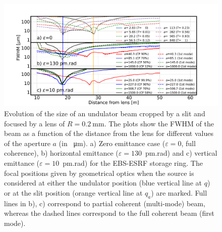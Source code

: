 \documentclass[doublecol]{epl2}
\begin{document}
\begin{figure}[t]
\hspace*{-1.5cm}
\centering
\includegraphics[width=1.15\textwidth]{evolution-eps-converted-to.pdf}
\caption{Evolution of the size of an undulator beam cropped by a slit and focused by a lens of $R=\SI{0.2}{\milli\meter}$.
The plots show the FWHM of the beam as a function of the distance from the lens for different values of the aperture $a$ (in \SI{}{\micro\meter}). 
a) Zero emittance case ($\varepsilon=0$, full coherence),
b) horizontal emittance ($\varepsilon=130$~pm.rad) and c) vertical emittance ($\varepsilon=10$~pm.rad) for the EBS-ESRF storage ring.
The focal positions given by geometrical optics when the source is considered at either the undulator position (blue vertical line at $q$) or at the slit position (orange vertical line at $q_a$) are marked.
Full lines in b), c) correspond to partial coherent (multi-mode) beam, whereas the dashed lines correspond to the full coherent beam (first mode).
}
\label{fig:oneTFund}
\end{figure}
\end{document}
